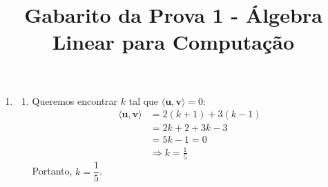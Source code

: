 \documentclass[a4paper,12pt]{article}
\title{Gabarito da Prova 1 - Álgebra Linear para Computação}
\date{}
\newcommand{\vect}[1]{\mathbf{#1}}
\newcommand{\inner}[2]{\langle #1, #2 \rangle}
\begin{document}
\maketitle

\begin{enumerate}
    \item  \begin{enumerate}
        \item Queremos encontrar $k$ tal que $\inner{\vect{u}}{\vect{v}} = 0$:
        \begin{align*}
            \inner{\vect{u}}{\vect{v}} & = 2(k+1) + 3(k-1)\\
            &= 2k + 2 + 3k - 3\\
            &= 5k - 1 = 0\\
            & \Rightarrow k = \frac{1}{5}
        \end{align*}
        Portanto, $k = \dfrac{1}{5}$.


\end{enumerate}
\end{enumerate}
\end{document}
